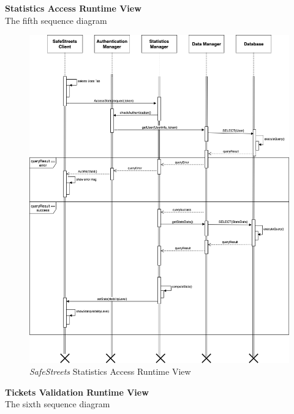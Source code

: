\documentclass{article}
\begin{document}
	\pagebreak
	\noindent
	{\bf Statistics Access Runtime View} \\
	The fifth sequence diagram \\
	\begin{figure}[H]
			\centering
			\includegraphics[scale=0.25]{Images/Diagrams/Runtime/stats_runtime.png}
			\caption{{\it SafeStreets} Statistics Access Runtime View}
	\end{figure}
	\pagebreak
	\noindent
	{\bf Tickets Validation Runtime View} \\
	The sixth sequence diagram \\
\end{document}
